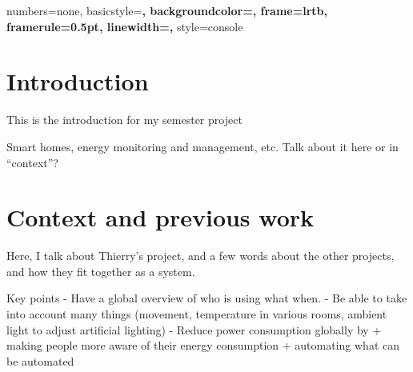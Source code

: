 
\newpage{}

\fancyfoot{}
\lhead{}
\cfoot{\thepage}        %
\rfoot{\today} %



\tableofcontents{}

\newpage

\lstset{language=C}


{
  numbers=none,
  basicstyle=\bf\ttfamily,
  backgroundcolor=\color{grey92},
  frame=lrtb,
  framerule=0.5pt,
  linewidth=\textwidth,
}
{
  style=console
}

\lstset{
  style=console
}



\section*{Introduction}
This is the introduction for my semester project

Smart homes, energy monitoring and management, etc. Talk about it here or in
``context''?

\section{Context and previous work}
Here, I talk about Thierry's project, and a few words about the other projects,
and how they fit together as a system.

Key points
  - Have a global overview of who is using what when.
  - Be able to take into account many things (movement, temperature in various
  rooms, ambient light to adjust artificial lighting)
  - Reduce power consumption globally by
    + making people more aware of their energy consumption
    + automating what can be automated

